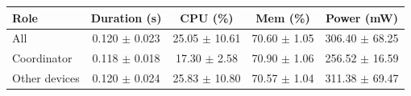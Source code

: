 \begin{tabular}{lcccc}
\hline
\textbf{Role} & \textbf{Duration (s)} & \textbf{CPU (\%)} & \textbf{Mem (\%)} & \textbf{Power (mW)} \\
\hline
All & 0.120 $\pm$ 0.023 & 25.05 $\pm$ 10.61 & 70.60 $\pm$ 1.05 & 306.40 $\pm$ 68.25 \\
Coordinator & 0.118 $\pm$ 0.018 & 17.30 $\pm$ 2.58 & 70.90 $\pm$ 1.06 & 256.52 $\pm$ 16.59 \\
Other devices & 0.120 $\pm$ 0.024 & 25.83 $\pm$ 10.80 & 70.57 $\pm$ 1.04 & 311.38 $\pm$ 69.47 \\
\hline
\end{tabular}
